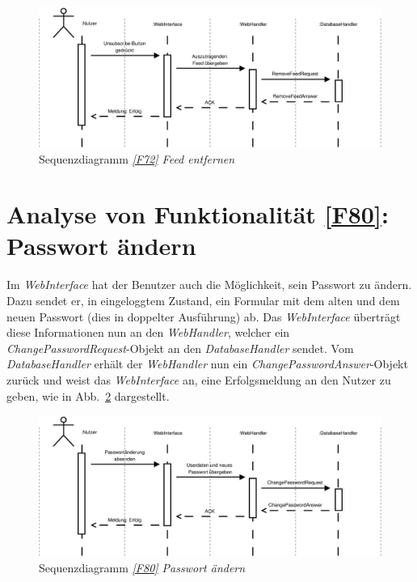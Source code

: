 \begin{figure}[h]
\centering
\includegraphics[width=1\textwidth]{Systementwurf/02_produktfunktionsanalyse/f720}
\caption{Sequenzdiagramm \textit{\ref{F72} Feed entfernen}
\label{sd72}}
\end{figure}

\FloatBarrier

\section{Analyse von Funktionalität \ref{F80}: Passwort ändern}

Im \textit{WebInterface} hat der Benutzer auch die Möglichkeit, sein Passwort zu
ändern. Dazu sendet er, in eingeloggtem Zustand, ein Formular mit dem alten und
dem neuen Passwort (dies in doppelter Ausführung) ab. Das \textit{WebInterface}
überträgt diese Informationen nun an den \textit{WebHandler}, welcher ein
\textit{ChangePasswordRequest}-Objekt an den \textit{DatabaseHandler} sendet.
Vom \textit{DatabaseHandler} erhält der \textit{WebHandler} nun ein
\textit{ChangePasswordAnswer}-Objekt zurück und weist das \textit{WebInterface}
an, eine Erfolgsmeldung an den Nutzer zu geben, wie in Abb.~\ref{sd80}
dargestellt.

\begin{figure}[h]
\centering
\includegraphics[width=1\textwidth]{Systementwurf/02_produktfunktionsanalyse/f800}
\caption{Sequenzdiagramm \textit{\ref{F80} Passwort ändern}
\label{sd80}}
\end{figure}


